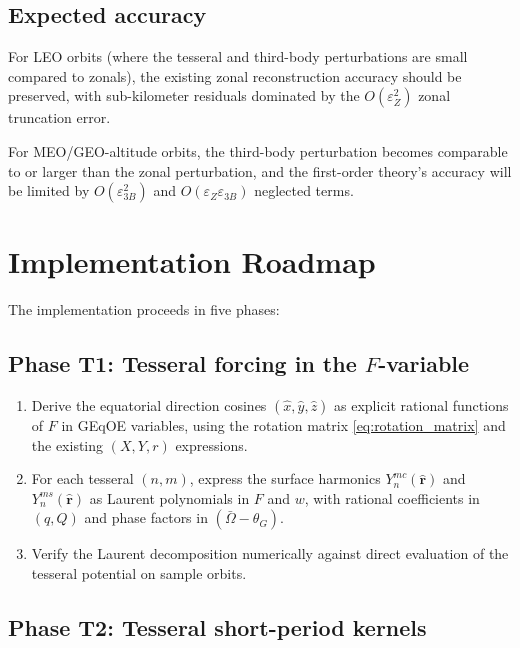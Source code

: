 \documentclass[11pt]{article}
\newcommand{\eps}{\varepsilon}
\begin{document}
\subsection{Expected accuracy}

For LEO orbits (where the tesseral and third-body perturbations are
small compared to zonals), the existing zonal reconstruction accuracy
should be preserved, with sub-kilometer residuals dominated by the
$O(\eps_Z^2)$ zonal truncation error.

For MEO/GEO-altitude orbits, the third-body perturbation becomes
comparable to or larger than the zonal perturbation, and the first-order
theory's accuracy will be limited by $O(\eps_{3B}^2)$ and
$O(\eps_Z \eps_{3B})$ neglected terms.


\section{Implementation Roadmap}
\label{sec:roadmap}

The implementation proceeds in five phases:

\subsection{Phase T1: Tesseral forcing in the $F$-variable}

\begin{enumerate}
\item Derive the equatorial direction cosines $(\hat x, \hat y, \hat z)$
as explicit rational functions of $F$ in GEqOE variables, using the
rotation matrix \eqref{eq:rotation_matrix} and the existing
$(X, Y, r)$ expressions.

\item For each tesseral $(n,m)$, express the surface harmonics
$Y_n^{mc}(\hat{\bm r})$ and $Y_n^{ms}(\hat{\bm r})$ as Laurent
polynomials in $F$ and $w$, with rational coefficients in $(q, Q)$ and
phase factors in $(\bar\Omega - \theta_G)$.

\item Verify the Laurent decomposition numerically against direct
evaluation of the tesseral potential on sample orbits.
\end{enumerate}

\subsection{Phase T2: Tesseral short-period kernels}
\end{document}
